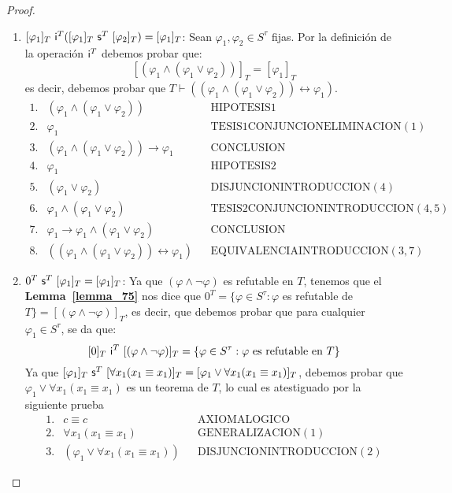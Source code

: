 \begin{proof}
\begin{enumerate}[(1)]
      \item $[\varphi_{1}]_{T} \ \IN^{T}([\varphi_{1}]_{T} \ \SU^{T} \ [\varphi_{2}]_{T}) = [\varphi_{1}]_{T}$: Sean
        $\varphi_{1}, \varphi_{2} \in S^{\tau}$ fijas. Por la definición de la operación $\mathsf{i}^{T}$ debemos probar que:
        \[
          [(\varphi_{1} \wedge (\varphi_{1} \vee \varphi_{2}))]_{T} = [\varphi_{1}]_{T}
        \]
        \PN es decir, debemos probar que $T \vdash ((\varphi_{1} \wedge (\varphi_{1} \vee \varphi_{2})) \leftrightarrow
        \varphi_{1})$.
        \[
        \begin{array}{llll}
          1. & (\varphi_{1} \wedge (\varphi_{1} \vee \varphi_{2})) && \text{HIPOTESIS1} \\
          2. & \varphi_{1} && \text{TESIS1CONJUNCIONELIMINACION}(1) \\
          3. & (\varphi_{1} \wedge (\varphi_{1} \vee \varphi_{2})) \rightarrow \varphi_{1} && \text{CONCLUSION} \\
          4. & \varphi_{1} && \text{HIPOTESIS2} \\
          5. & (\varphi_{1} \vee \varphi_{2}) && \text{DISJUNCIONINTRODUCCION}(4) \\
          6. & \varphi_{1} \wedge (\varphi_{1} \vee \varphi_{2}) && \text{TESIS2CONJUNCIONINTRODUCCION}(4,5) \\
          7. & \varphi_{1} \rightarrow \varphi_{1} \wedge (\varphi_{1} \vee \varphi_{2}) && \text{CONCLUSION} \\
          8. & ((\varphi_{1} \wedge (\varphi_{1} \vee \varphi_{2})) \leftrightarrow \varphi_{1}) &&
            \text{EQUIVALENCIAINTRODUCCION}(3,7)
        \end{array}
        \]

      \item $0^{T} \ \mathsf{s}^{T} \ [\varphi_{1}]_{T} = [\varphi_{1}]_{T}$: Ya que $(\varphi \wedge \lnot\varphi)$ es
        refutable en $T$, tenemos que el \textbf{Lemma~\ref{lemma_75}} nos dice que $0^{T} =
        \{\varphi \in S^{\tau}: \varphi$ es refutable de $T\} = [(\varphi \wedge \lnot\varphi)]_{T}$, es decir,
        que debemos probar que para cualquier $\varphi_{1} \in S^{\tau}$, se da que:
        \[
          [0]_{T} \ \mathsf{i}^{T} \ [(\varphi \wedge \lnot\varphi)]_{T} = \{\varphi \in S^{\tau}: \varphi \ \text{es refutable
          en} \ T\}
        \]
       \PN Ya que $[\varphi_{1}]_{T} \ \mathsf{s}^{T} \ [\forall x_{1} (x_{1} \equiv x_{1})]_{T} = [\varphi_{1} \vee \forall
       x_{1}(x_{1}\equiv x_{1})]_{T}$, debemos probar que $\varphi_{1} \vee \forall x_{1} (x_{1} \equiv x_{1})$ es un
       teorema de $T$, lo cual es atestiguado por la siguiente prueba
        \[
          \begin{array}{llll}
            1. & c \equiv c && \text{AXIOMALOGICO} \\
            2. & \forall x_{1} (x_{1} \equiv x_{1}) && \text{GENERALIZACION}(1) \\
            3. & (\varphi_{1} \vee \forall x_{1} (x_{1}\equiv x_{1})) && \text{DISJUNCIONINTRODUCCION}(2)
          \end{array}
        \]


\end{enumerate}
\end{proof}
